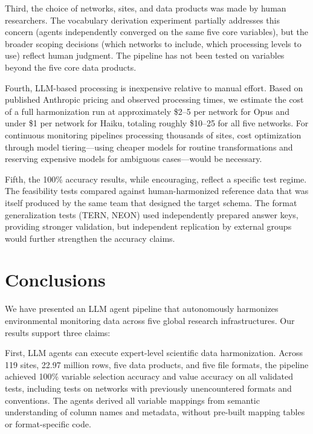 \documentclass[review,authoryear]{elsarticle}
\begin{document}
Third, the choice of networks, sites, and data products was made by human researchers. The vocabulary derivation experiment partially addresses this concern (agents independently converged on the same five core variables), but the broader scoping decisions (which networks to include, which processing levels to use) reflect human judgment. The pipeline has not been tested on variables beyond the five core data products.

Fourth, LLM-based processing is inexpensive relative to manual effort. Based on published Anthropic pricing and observed processing times, we estimate the cost of a full harmonization run at approximately \$2--5 per network for Opus and under \$1 per network for Haiku, totaling roughly \$10--25 for all five networks. For continuous monitoring pipelines processing thousands of sites, cost optimization through model tiering---using cheaper models for routine transformations and reserving expensive models for ambiguous cases---would be necessary.

Fifth, the 100\% accuracy results, while encouraging, reflect a specific test regime. The feasibility tests compared against human-harmonized reference data that was itself produced by the same team that designed the target schema. The format generalization tests (TERN, NEON) used independently prepared answer keys, providing stronger validation, but independent replication by external groups would further strengthen the accuracy claims.

\section{Conclusions}
\label{sec:conclusions}

We have presented an LLM agent pipeline that autonomously harmonizes environmental monitoring data across five global research infrastructures. Our results support three claims:

First, LLM agents can execute expert-level scientific data harmonization. Across 119 sites, 22.97 million rows, five data products, and five file formats, the pipeline achieved 100\% variable selection accuracy and value accuracy on all validated tests, including tests on networks with previously unencountered formats and conventions. The agents derived all variable mappings from semantic understanding of column names and metadata, without pre-built mapping tables or format-specific code.
\end{document}
